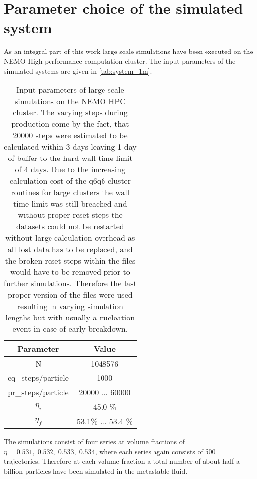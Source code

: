 
\label{chp:data_analysis}
\section{Parameter choice of the simulated system}
\label{sec:system_choice}
As an integral part of this work large scale simulations have been executed on the NEMO High performance computation cluster. The input parameters of the simulated systems are given in \autoref{tab:system_1m}.

\begin{table}[ht]
\centering
\begin{tabular}{c|c}
Parameter & Value \\ \hline
N & 1048576 \\
eq\_steps/particle & 1000 \\
pr\_steps/particle & 20000  ... 60000 \\
$\eta_i$ & 45.0 \% \\
$\eta_f$ & 53.1\% ... 53.4 \% \\
\end{tabular}
\caption[Simulation parameters of data production systems]{Input parameters of large scale simulations on the NEMO HPC cluster. The varying steps during production come by the fact, that 20000 steps were estimated to be calculated within 3 days leaving 1 day of buffer to the hard wall time limit of 4 days. Due to the increasing calculation cost of the q6q6 cluster routines for large clusters the wall time limit was still breached and without proper reset steps the datasets could not be restarted without large calculation overhead as all lost data has to be replaced, and the broken reset steps within the files would have to be removed prior to further simulations. Therefore the last proper version of the files were used resulting in varying simulation lengths but with usually a nucleation event in case of early breakdown.}
\label{tab:system_1m}
\end{table}

The simulations consist of four series at volume fractions of $\eta = 0.531,\;0.532,\;0.533,\;0.534$, where each series again consists of 500 trajectories. Therefore at each volume fraction a total number of about half a billion particles have been simulated in the metastable fluid.\\

